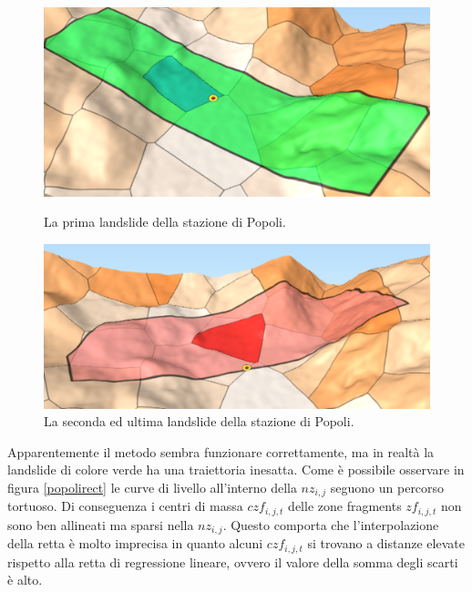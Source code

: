 \begin{figure}[h]
	\hspace{0.1\linewidth}
	\begin{minipage}[t]{0.35\linewidth}
		\centering
		\includegraphics[width=1\textwidth]{images/PopoliLandslide1}
		\caption{La prima landslide della stazione di Popoli.}
		\label{popolilandslide1}
	\end{minipage}
	\hspace{0.1\linewidth}
	\begin{minipage}[t]{0.35\linewidth}
		\centering
		\includegraphics[width=1\textwidth]{images/PopoliLandslide2}
		\caption{La seconda ed ultima landslide della stazione di Popoli.}
		\label{popolilandslide2}
	\end{minipage}
\end{figure}


Apparentemente il metodo sembra funzionare correttamente, ma in realtà la landslide di colore verde ha una traiettoria inesatta. Come è possibile osservare in figura \ref{popolirect} le curve di livello all'interno della $nz_{i,j}$ seguono un percorso tortuoso.  Di conseguenza i centri di massa $czf_{i,j,t}$ delle zone fragments $zf_{i,j,t}$ non sono ben allineati ma sparsi nella $nz_{i,j}$. Questo comporta che l'interpolazione della retta è molto imprecisa in quanto alcuni $czf_{i,j,t}$ si trovano a distanze elevate rispetto alla retta di regressione lineare, ovvero il valore della somma degli scarti è alto. 

